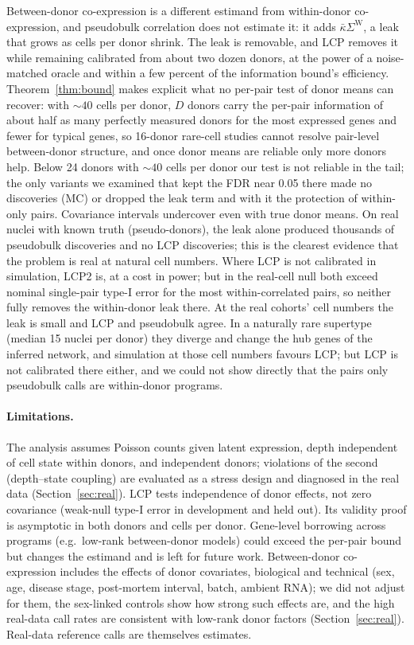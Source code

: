 \documentclass[10pt,letterpaper]{article}
\theoremstyle{definition}
\newcommand{\SW}{\Sigma^{\mathrm{W}}}
\begin{document}
Between-donor co-expression is a different estimand from within-donor co-expression, and pseudobulk correlation does not estimate it: it adds $\bar\kappa\SW$, a leak that grows as cells per donor shrink. The leak is removable, and LCP removes it while remaining calibrated from about two dozen donors, at the power of a noise-matched oracle and within a few percent of the information bound's efficiency. Theorem~\ref{thm:bound} makes explicit what no per-pair test of donor means can recover: with ${\sim}40$ cells per donor, $D$ donors carry the per-pair information of about half as many perfectly measured donors for the most expressed genes and fewer for typical genes, so 16-donor rare-cell studies cannot resolve pair-level between-donor structure, and once donor means are reliable only more donors help. Below 24 donors with ${\sim}40$ cells per donor our test is not reliable in the tail; the only variants we examined that kept the FDR near 0.05 there made no discoveries (MC) or dropped the leak term and with it the protection of within-only pairs. Covariance intervals undercover even with true donor means. On real nuclei with known truth (pseudo-donors), the leak alone produced thousands of pseudobulk discoveries and no LCP discoveries; this is the clearest evidence that the problem is real at natural cell numbers. Where LCP is not calibrated in simulation, LCP2 is, at a cost in power; but in the real-cell null both exceed nominal single-pair type-I error for the most within-correlated pairs, so neither fully removes the within-donor leak there. At the real cohorts' cell numbers the leak is small and LCP and pseudobulk agree. In a naturally rare supertype (median 15 nuclei per donor) they diverge and change the hub genes of the inferred network, and simulation at those cell numbers favours LCP; but LCP is not calibrated there either, and we could not show directly that the pairs only pseudobulk calls are within-donor programs.

\paragraph{Limitations.} The analysis assumes Poisson counts given latent expression, depth independent of cell state within donors, and independent donors; violations of the second (depth--state coupling) are evaluated as a stress design and diagnosed in the real data (Section~\ref{sec:real}). LCP tests independence of donor effects, not zero covariance (weak-null type-I error \QQLCP{} in development and \QQHO{} held out). Its validity proof is asymptotic in both donors and cells per donor. Gene-level borrowing across programs (e.g.\ low-rank between-donor models) could exceed the per-pair bound but changes the estimand and is left for future work. Between-donor co-expression includes the effects of donor covariates, biological and technical (sex, age, disease stage, post-mortem interval, batch, ambient RNA); we did not adjust for them, the sex-linked controls show how strong such effects are, and the high real-data call rates are consistent with low-rank donor factors (Section~\ref{sec:real}). Real-data reference calls are themselves estimates.
\end{document}
